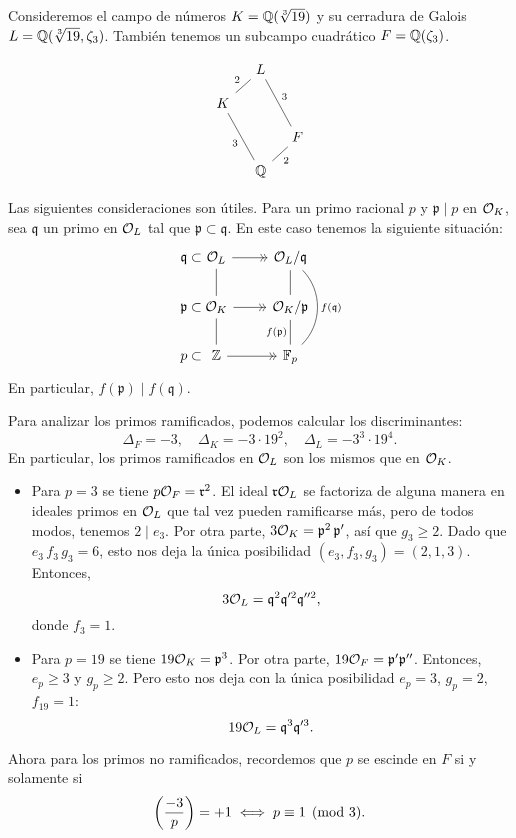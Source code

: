 \begin{ejemplo}
  Consideremos el campo de números $K = \mathbb{Q} (\sqrt[3]{19})$ y su cerradura de
  Galois $L = \mathbb{Q} (\sqrt[3]{19},\zeta_3)$. También tenemos un subcampo
  cuadrático $F = \mathbb{Q} (\zeta_3)$.

  \[ \begin{tikzcd}[row sep=1em, column sep=1em]
    & L\ar[-]{dl}[swap]{2}\ar[-]{ddr}{3} \\
    K\ar[-]{ddr}[swap]{3} \\
    & & F\ar[-]{dl}{2} \\
    & \QQ
    \end{tikzcd} \]

  Las siguientes consideraciones son útiles. Para un primo racional $p$ y
  $\mathfrak{p} \mid p$ en $\mathcal{O}_K$, sea $\mathfrak{q}$ un primo en $\mathcal{O}_L$ tal que
  $\mathfrak{p} \subset \mathfrak{q}$. En este caso tenemos la siguiente
  situación:
  \[ \begin{tikzcd}
    \mathfrak{q} &[-3em] \subset &[-3em] \O_L\ar[-]{d}\ar[->>]{r} & \O_L/\mathfrak{q}\ar[-]{d}\ar[-,bend left=45]{dd}{f (\mathfrak{q})} \\
    \mathfrak{p} & \subset & \O_K\ar[-]{d}\ar[->>]{r} & \O_K/\mathfrak{p}\ar[-]{d}[swap]{f (\mathfrak{p})} \\
    p & \subset & \ZZ\ar[->>]{r} & \FF_p
  \end{tikzcd} \]
  En particular, $f (\mathfrak{p}) \mid f (\mathfrak{q})$.

  \vspace{1em}

  Para analizar los primos ramificados, podemos calcular los discriminantes:
  \[ \Delta_F = -3, \quad
     \Delta_K = -3\cdot 19^2, \quad
     \Delta_L = -3^3\cdot 19^4. \]
  En particular, los primos ramificados en $\mathcal{O}_L$ son los mismos que en $\mathcal{O}_K$.

  \begin{itemize}
  \item Para $p = 3$ se tiene $p\mathcal{O}_F = \mathfrak{r}^2$. El ideal
    $\mathfrak{r}\mathcal{O}_L$ se factoriza de alguna manera en ideales primos en
    $\mathcal{O}_L$ que tal vez pueden ramificarse más, pero de todos modos, tenemos
    $2 \mid e_3$. Por otra parte,
    $3\mathcal{O}_K = \mathfrak{p}^2 \, \mathfrak{p}'$, así que $g_3 \ge 2$. Dado
    que $e_3\,f_3\,g_3 = 6$, esto nos deja la única posibilidad
    $(e_3,f_3,g_3) = (2,1,3)$. Entonces,
    $$3\mathcal{O}_L = \mathfrak{q}^2\mathfrak{q}'^2\mathfrak{q}''^2,$$
    donde $f_3 = 1$.
    
  \item Para $p = 19$ se tiene $19\mathcal{O}_K = \mathfrak{p}^3$. Por otra parte,
    $19\mathcal{O}_F = \mathfrak{p}'\mathfrak{p}''$. Entonces, $e_p \ge 3$ y
    $g_p \ge 2$. Pero esto nos deja con la única posibilidad
    $e_p = 3$, $g_p = 2$, $f_{19} = 1$:
    $$19\mathcal{O}_L = \mathfrak{q}^3\mathfrak{q}'^3.$$
  \end{itemize}
  Ahora para los primos no ramificados, recordemos que $p$ se escinde en
  $F$ si y solamente si
  $$\left(\frac{-3}{p}\right) = +1 \iff p \equiv 1 \pmod{3}.$$


\end{ejemplo}
